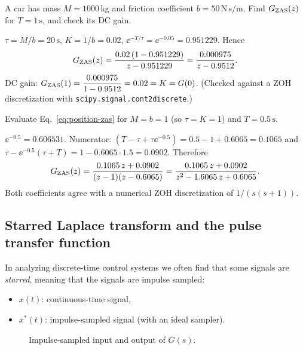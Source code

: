 \begin{problem}
A car has mass $M=1000\,\mathrm{kg}$ and friction coefficient $b=50\,\mathrm{N\,s/m}$. Find $G_{\mathrm{ZAS}}(z)$ for
$T=1\,\mathrm{s}$, and check its DC gain.
\end{problem}
\begin{solution}
$\tau=M/b=20\,\mathrm{s}$, $K=1/b=0.02$, $\ee^{-T/\tau}=\ee^{-0.05}=0.951229$. Hence
\[
  G_{\mathrm{ZAS}}(z)=\frac{0.02\,(1-0.951229)}{z-0.951229}=\frac{0.000975}{z-0.9512}.
\]
DC gain: $G_{\mathrm{ZAS}}(1)=\dfrac{0.000975}{1-0.9512}=0.02=K=G(0)$. \;(Checked against a ZOH discretization with
\texttt{scipy.signal.cont2discrete}.)
\end{solution}

\begin{problem}
Evaluate Eq.~\eqref{eq:position-zas} for $M=b=1$ (so $\tau=K=1$) and $T=0.5\,\mathrm{s}$.
\end{problem}
\begin{solution}
$\ee^{-0.5}=0.606531$. Numerator: $(T-\tau+\tau\ee^{-0.5})=0.5-1+0.6065=0.1065$ and
$\tau-\ee^{-0.5}(\tau+T)=1-0.6065\cdot1.5=0.0902$. Therefore
\[
  G_{\mathrm{ZAS}}(z)=\frac{0.1065\,z+0.0902}{(z-1)(z-0.6065)}=\frac{0.1065\,z+0.0902}{z^{2}-1.6065\,z+0.6065}.
\]
Both coefficients agree with a numerical ZOH discretization of $1/(s(s+1))$.
\end{solution}

\subsection{Starred Laplace transform and the pulse transfer function}
In analyzing discrete-time control systems we often find that some signals are \emph{starred}, meaning that
the signals are impulse sampled:
\begin{itemize}
  \item $x(t)$: continuous-time signal,
  \item $x^{*}(t)$: impulse-sampled signal (with an ideal sampler).
\end{itemize}

\begin{figure}[ht]
\centering
\resizebox{0.8\linewidth}{!}{\figStarred}
\caption{Impulse-sampled input and output of $G(s)$.}
\end{figure}

